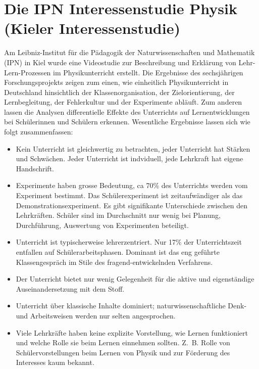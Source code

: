 \section{Die IPN Interessenstudie Physik ({\glqq}Kieler{\grqq} Interessenstudie)}
Am Leibniz-Institut f{\"u}r die P{\"a}dagogik der Naturwissenschaften und Mathematik (IPN) in Kiel wurde eine Videostudie zur Beschreibung und Erkl{\"a}rung von Lehr-Lern-Prozessen im Physikunterricht erstellt. Die Ergebnisse des sechsj{\"a}hrigen Forschungsprojekts zeigen zum einen, wie einheitlich Physikunterricht in Deutschland hinsichtlich der Klassenorganisation, der Zielorientierung, der Lernbegleitung, der Fehlerkultur und der Experimente abl{\"a}uft. Zum anderen lassen die Analysen differentielle Effekte des Unterrichts auf Lernentwicklungen bei Sch{\"u}lerinnen und Sch{\"u}lern erkennen.
\mip
Wesentliche Ergebnisse lassen sich wie folgt zusammenfassen:
\begin{itemize}
\item
Kein Unterricht ist gleichwertig zu betrachten, jeder Unterricht hat St{\"a}rken und Schw{\"a}chen. Jeder Unterricht ist indviduell, jede Lehrkraft hat eigene {\glqq}Handschrift{\grqq}.
\item
 Experimente haben grosse Bedeutung, ca 70\% des Unterrichts werden vom Experiment bestimmt. Das Sch{\"u}lerexperiment ist zeitaufw{\"a}ndiger als das Demonstrationsexperiment. Es gibt signifikante Unterschiede zwischen den Lehrkr{\"a}ften. Sch{\"u}ler sind im Durchschnitt nur wenig bei Planung, Durchf{\"u}hrung, Auswertung von Experimenten beteiligt.
 \item
Unterricht ist typischerweise lehrerzentriert. Nur 17\% der Unterrichtszeit entfallen auf Sch{\"u}lerarbeitsphasen. Dominant ist das eng gef{\"u}hrte Klassengespr{\"a}ch im Stile des fragend-entwickelnden Verfahrens.
\item
Der Unterricht bietet nur wenig Gelegenheit f{\"u}r die aktive und eigenst{\"a}ndige Auseinandersetzung mit dem Stoff.
\item
Unterricht {\"u}ber {\glqq}klassische{\grqq} Inhalte dominiert; naturwissenschaftliche Denk- und Arbeitsweisen werden nur selten angesprochen.
\item
Viele Lehrkr{\"a}fte haben keine explizite Vorstellung,  wie Lernen funktioniert und welche Rolle sie beim Lernen einnehmen sollten. Z.~B. Rolle von Sch{\"u}lervorstellungen beim Lernen von Physik und zur F{\"o}rderung des Interesses kaum bekannt.
\end{itemize}



